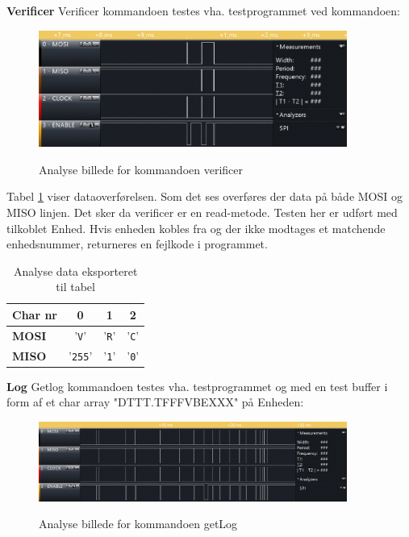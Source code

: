 \textbf{Verificer}
Verificer kommandoen testes vha. testprogrammet ved kommandoen: 


\begin{figure}[H]
\centering
{\includegraphics[width=0.90\textwidth]{filer/integrationstest/billeder/spi_verify}}
\caption{Analyse billede for kommandoen verificer}
\label{lab:scop_verify}
\end{figure}

Tabel \ref{table:scop_verify} viser dataoverførelsen. Som det ses overføres der data på både MOSI og MISO linjen. Det sker da verificer er en read-metode. Testen her er udført med tilkoblet Enhed. Hvis enheden kobles fra og der ikke modtages et matchende enhedsnummer, returneres en fejlkode i programmet. 
 

\begin{table}[H]
	\caption{Analyse data eksporteret til tabel}
	\centering
	\begin{tabular}{|l|c|c|c|}
		\hline 
		\textbf{Char nr} & \textbf{0} & \textbf{1} & \textbf{2}\\ 		
		\hline 
		\textbf{MOSI} & '\verb+V+' & '\verb+R+'  & '\verb+C+'\\ 
		\hline 
		\textbf{MISO} & '\verb+255+' & '\verb+1+' & '\verb+0+' \\ 
		\hline 
	\end{tabular} 
	\label{table:scop_verify}
\end{table}



\textbf{Log}
Getlog kommandoen testes vha. testprogrammet og med en test buffer i form af et char array "DTTT.TFFFVBEXXX" på Enheden: 

\begin{figure}[H]
\centering
{\includegraphics[width=0.90\textwidth]{filer/integrationstest/billeder/spi_getlog_and_error}}
\caption{Analyse billede for kommandoen getLog}
\label{lab:scop_getlog}
\end{figure}

